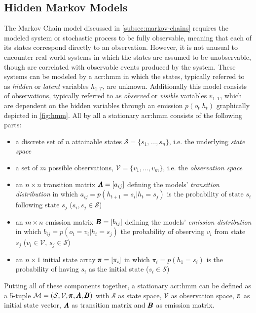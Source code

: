 \subsection{Hidden Markov Models}
\label{subsec:hidden-markov-models}

The Markov Chain model discussed in \autoref{subsec:markov-chains} requires the modeled system or stochastic process to be fully observable, meaning that each of its states correspond directly to an observation.
However, it is not unusual to encounter real-world systems in which the states are assumed to be unobservable, though are correlated with observable events produced by the system.
These systems can be modeled by a \acrfull{acr:hmm} in which the states, typically referred to as \textit{hidden} or \textit{latent} variables $h_{1:T}$, are unknown.
Additionally this model consists of observations, typically referred to as \textit{observed} or \textit{visible} variables $v_{1:T}$, which are dependent on the hidden variables through an emission $p(o_t\vert h_t)$ graphically depicted in \autoref{fig:hmm}. All by all a stationary \acrshort{acr:hmm}
consists of the following parts:

\begin{itemize}
	\item a discrete set of $n$ attainable states $\mathcal{S} = \{s_1, \ldots, s_n\}$, i.e. the underlying \textit{state space}
	\item a set of $m$ possible observations, $\mathcal{V} = \{v_1, \ldots, v_m\}$, i.e. the \textit{observation space}
	\item an $n \times n$ transition matrix $\pmb{A} = [a_{ij}]$ defining the models' \textit{transition distribution} in which $a_{ij} = p(h_{t+1} = s_i \vert h_t = s_j)$ is the probability of state $s_i$ following state $s_j$ ($s_i, s_j \in \mathcal{S}$)
	\item an $m \times n$ emission matrix $\pmb{B} = [b_{ij}]$ defining the models' \textit{emission distribution} in which $b_{ij} = p(o_t = v_i \vert h_t = s_j)$ the probability of observing $v_i$ from state $s_j$ ($v_i \in \mathcal{V}$, $s_j \in \mathcal{S}$)
	\item an $n \times 1$ initial state array $\pmb{\pi} = [\pi_i]$ in which $\pi_i = p(h_1 = s_i)$ is the probability of having $s_i$ as the initial state ($s_i \in \mathcal{S}$)
\end{itemize}
Putting all of these components together, a stationary \acrshort{acr:hmm} can be defined as a 5-tuple $\mathcal{M} = (\mathcal{S}, \mathcal{V}, \pmb{\pi}, \pmb{A}, \pmb{B})$ with $\mathcal{S}$ as state space, $\mathcal{V}$ as observation space, $\pmb{\pi}$ as initial state vector, $\pmb{A}$ as transition matrix and $\pmb{B}$ as emission matrix.

